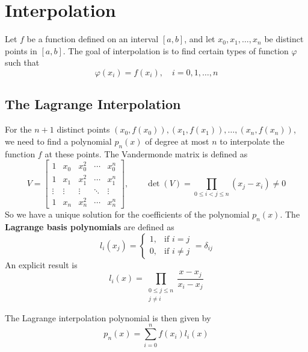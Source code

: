 \documentclass{matharticle}
\begin{document}
\section{Interpolation}
Let $f$ be a function defined on an interval $[a, b]$, and let $x_0, x_1, \ldots, x_n$ be distinct points in $[a, b]$. The goal of interpolation is to find certain types of function $\varphi$ such that
\begin{equation}
	\varphi(x_i) = f(x_i), \quad i = 0, 1, \ldots, n
\end{equation}

\subsection{The Lagrange Interpolation}
For the $n+1$ distinct points $(x_0, f(x_0)), (x_1, f(x_1)), \ldots, (x_n, f(x_n))$, we need to find a polynomial $p_n(x)$ of degree at most $n$ to interpolate the function $f$ at these points. The Vandermonde matrix is defined as
\begin{equation}
	V = \begin{bmatrix}
		1      & x_0    & x_0^2  & \cdots & x_0^n  \\
		1      & x_1    & x_1^2  & \cdots & x_1^n  \\
		\vdots & \vdots & \vdots & \ddots & \vdots \\
		1      & x_n    & x_n^2  & \cdots & x_n^n
	\end{bmatrix}, \qquad \det(V) = \prod_{0 \leq i < j \leq n} (x_j - x_i) \neq 0
\end{equation}
So we have a unique solution for the coefficients of the polynomial $p_n(x)$. The \textbf{Lagrange basis polynomials} are defined as
\begin{equation}
	l_i(x_j) = \begin{cases}
		1, & \text{if } i = j    \\
		0, & \text{if } i \neq j
	\end{cases} = \delta_{ij}
\end{equation}
An explicit result is
\begin{equation}
	l_i(x) = \prod_{\substack{0 \leq j \leq n \\ j \neq i}} \frac{x - x_j}{x_i - x_j}
\end{equation}

The Lagrange interpolation polynomial is then given by
\begin{equation}
	p_n(x) = \sum_{i=0}^{n} f(x_i) l_i(x)
\end{equation}
\end{document}
